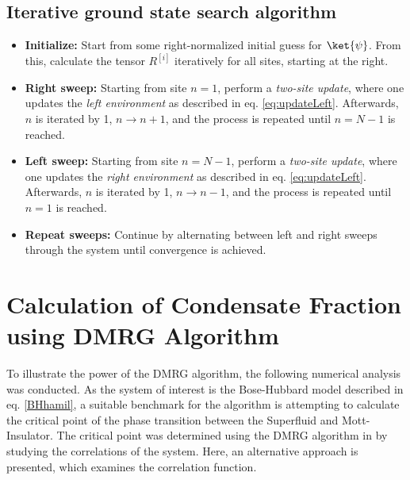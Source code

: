 \subsection{Iterative ground state search algorithm}
\begin{itemize}
\item[]
\textbf{Initialize:} Start from some right-normalized initial guess for $\ket{\psi}$. From this, calculate the tensor $R^{[i]}$ iteratively for all sites, starting at the right.

\item[]
\textbf{Right sweep:} Starting from site $n = 1$, perform a \textit{two-site update}, where one updates the \textit{left environment} as described in eq. \eqref{eq:updateLeft}. Afterwards, $n$ is iterated by 1, $n \rightarrow n + 1$, and the process is repeated until $n = N-1$ is reached.

\item[]
\textbf{Left sweep:} Starting from site $n = N-1$, perform a \textit{two-site update}, where one updates the \textit{right environment} as described in eq. \eqref{eq:updateLeft}. Afterwards, $n$ is iterated by 1, $n \rightarrow n - 1$, and the process is repeated until $n = 1$ is reached.

\item[]
\textbf{Repeat sweeps:} Continue by alternating between left and right sweeps through the system until convergence is achieved.  
\end{itemize}


\section{Calculation of Condensate Fraction using DMRG Algorithm}
To illustrate the power of the DMRG algorithm, the following numerical analysis was conducted. As the system of interest is the Bose-Hubbard model described in eq. \eqref{BHhamil}, a suitable benchmark for the algorithm is attempting to calculate the critical point of the phase transition between the Superfluid and Mott-Insulator. The critical point was determined using the DMRG algorithm in \cite{Kuhner2000} by studying the correlations of the system. Here, an alternative approach is presented, which examines the correlation function.\\

